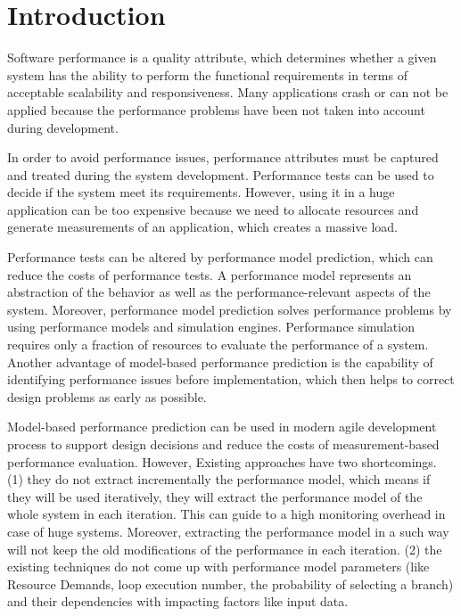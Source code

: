 
\chapter{Introduction}
\label{ch:Introduction}


Software performance is a quality attribute, which determines whether a given system has the ability to perform the functional requirements in terms of acceptable scalability and responsiveness. Many applications crash or can not be applied because the performance problems have been not taken into account during development. 

In order to avoid performance issues, performance attributes must be captured and treated during the system development. Performance tests can be used to decide if the system meet its requirements. However, using it in a huge application can be too expensive because we need to allocate resources and generate measurements of an application, which creates a massive load. 

Performance tests can be altered by performance model prediction, which can reduce the costs of performance tests. A performance model represents an abstraction of the behavior as well as the performance-relevant aspects of the system. Moreover, performance model prediction solves performance problems by using performance models and simulation engines. Performance simulation requires only a fraction of resources to evaluate the performance of a system. Another advantage of model-based performance prediction is the capability of identifying performance issues before implementation, which then helps to correct design problems as early as possible. 

Model-based performance prediction can be used in modern agile development process to support design decisions and reduce the costs of measurement-based performance evaluation. However, Existing approaches have two shortcomings. (1) they do not extract incrementally the performance model, which means if they will be used iteratively, they will extract the performance model of the whole system in each iteration. This can guide to a high monitoring overhead in case of huge systems. Moreover, extracting the performance model in a such way will not keep the old modifications of the performance in each iteration.  (2) the existing techniques do not come up with performance model parameters (like Resource Demands, loop execution number, the probability of selecting a branch) and their dependencies with impacting factors like input data.

